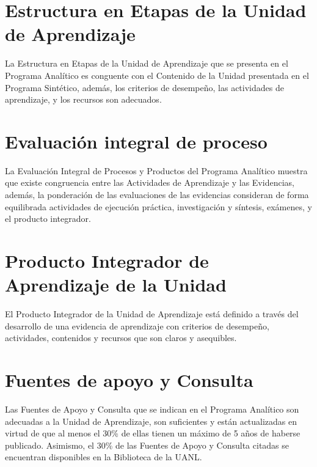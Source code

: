 \documentclass{article}
\newcommand{\sino}{\hfill \CheckBox[checkboxsymbol=\ding{56}]{S\'{i}}\quad\CheckBox[checkboxsymbol=\ding{56}]{No}}
\newcommand{\rsino}{\begin{flushright}\sino\end{flushright}}
\begin{document}
\begin{Form}
\newpage

\section{Estructura en Etapas de la Unidad de Aprendizaje}

La Estructura en Etapas de la Unidad de Aprendizaje que se presenta en el Programa
Anal\'{i}tico es conguente con el Contenido de la Unidad presentada en el Programa Sint\'{e}tico,
adem\'{a}s, los criterios de desempe\~{n}o, las actividades de aprendizaje, y los recursos son
adecuados. \sino

\section{Evaluaci\'{o}n integral de proceso}

La Evaluaci\'{o}n Integral de Procesos y Productos del Programa Anal\'{i}tico muestra que existe
congruencia entre las Actividades de Aprendizaje y las Evidencias, adem\'{a}s, la ponderaci\'{o}n
de las evaluaciones de las evidencias consideran de forma equilibrada actividades de
ejecuci\'{o}n pr\'{a}ctica, investigaci\'{o}n y s\'{i}ntesis, ex\'{a}menes, y el producto integrador. \sino

\section{Producto Integrador de Aprendizaje de la Unidad}

El Producto Integrador de la Unidad de Aprendizaje est\'{a} definido a trav\'{e}s del desarrollo de
una evidencia de aprendizaje con criterios de desempe\~{n}o, actividades, contenidos y
recursos que son claros y asequibles. \sino

\section{Fuentes de apoyo y Consulta}

Las Fuentes de Apoyo y Consulta que se indican en el Programa Anal\'{i}tico son adecuadas a
la Unidad de Aprendizaje, son suficientes y est\'{a}n actualizadas en virtud de que al menos el
30\% de ellas tienen un m\'{a}ximo de 5 a\~{n}os de haberse publicado. Asimismo, el 30\% de las
Fuentes de Apoyo y Consulta citadas se encuentran disponibles en la Biblioteca de la
UANL. \rsino


\end{Form}
\end{document}
